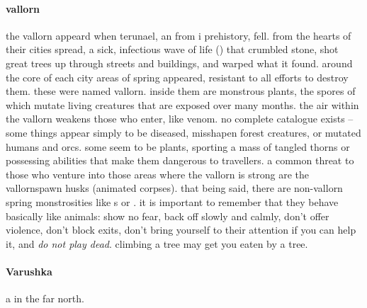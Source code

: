 \paragraph{vallorn} the vallorn appeard when terunael, an  from i prehistory, fell. from the hearts of their cities spread, a sick, infectious wave of life () that crumbled stone, shot great trees up through streets and buildings, and warped what it found. around the core of each city areas of spring appeared, resistant to all efforts to destroy them. these were named vallorn. inside them are monstrous plants, the spores of which mutate living creatures that are exposed over many months. the air within the vallorn weakens those who enter, like venom. no complete catalogue exists – some things appear simply to be diseased, misshapen forest creatures, or mutated humans and orcs. some seem to be plants, sporting a mass of tangled thorns or possessing abilities that make them dangerous to travellers. a common threat to those who venture into those areas where the vallorn is strong are the vallornspawn husks (animated corpses). that being said, there are non-vallorn spring monstrosities like s or . it is important to remember that they behave basically like animals: show no fear, back off slowly and calmly, don't offer violence, don't block exits, don't bring yourself to their attention if you can help it, and \emph{do not play dead}. climbing a tree may get you eaten by a tree.
\paragraph{Varushka} a  in the far north.
